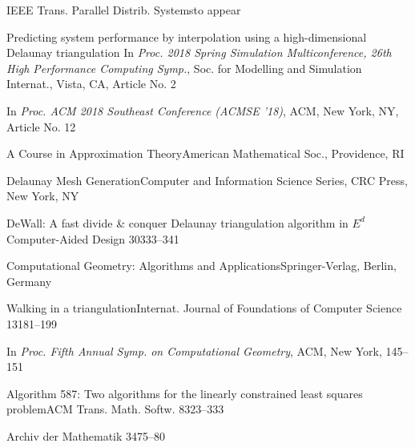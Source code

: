 {{
{IEEE Trans. Parallel Distrib. Systems}{to appear}

{Predicting system performance by interpolation using a high-dimensional
Delaunay triangulation} {In {\sl Proc. 2018 Spring Simulation Multiconference,
26th High Performance Computing Symp.}, Soc. for Modelling and Simulation
Internat., Vista, CA, Article No. 2}

 {In {\sl Proc. ACM 2018 Southeast Conference
(ACMSE '18)}, ACM, New York, NY, Article No. 12}

{A Course in Approximation Theory}{American Mathematical Soc., 
Providence, RI}

{Delaunay Mesh Generation}{Computer and Information Science
Series, CRC Press, New York, NY}

{DeWall: A fast divide \& conquer Delaunay triangulation algorithm in $E^d$}
{Computer-Aided Design 30}{333--341}

{Computational Geometry: Algorithms and Applications}{Springer-Verlag,
Berlin, Germany}

{Walking in a triangulation}{Internat. Journal of Foundations of
Computer Science 13}{181--199}

 {In {\sl Proc. Fifth Annual Symp. on Computational Geometry}, 
ACM, New York, 145--151}

{Algorithm 587: Two algorithms for the linearly constrained least
squares problem}{ACM Trans. Math. Softw. 8}{323--333}

{Archiv der Mathematik 34}{75--80}

}}
